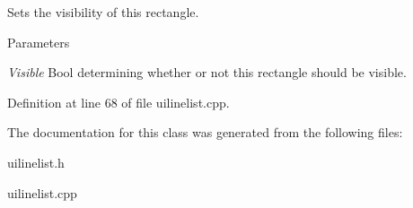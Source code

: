 Sets the visibility of this rectangle. 


\begin{DoxyParams}{Parameters}
\item[{\em Visible}]Bool determining whether or not this rectangle should be visible. \end{DoxyParams}


Definition at line 68 of file uilinelist.cpp.



The documentation for this class was generated from the following files:\begin{DoxyCompactItemize}
\item 
uilinelist.h\item 
uilinelist.cpp\end{DoxyCompactItemize}
